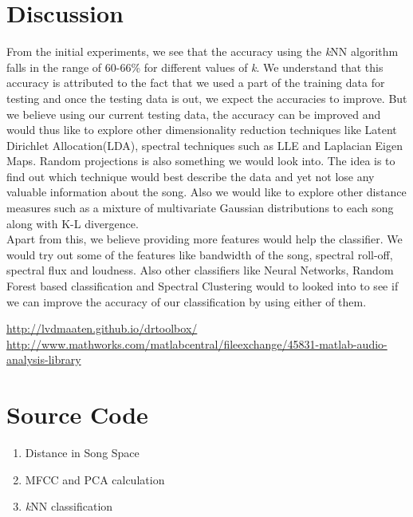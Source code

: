 \documentclass[12pt]{article}
\begin{document}
\section{Discussion}
\begin{flushleft}
From the initial experiments, we see that the accuracy using the \textit{k}NN algorithm falls in the range of 60-66\% for different values of \textit{k}. We understand that this accuracy is attributed to the fact that we used a part of the training data for testing and once the testing data is out, we expect the accuracies to improve. But we believe using our current testing data, the accuracy can be improved and would thus like to explore other dimensionality reduction techniques like Latent Dirichlet Allocation(LDA), spectral techniques such as LLE and Laplacian Eigen Maps. Random projections is also something we would look into. The idea is to find out which technique would best describe the data and yet not lose any valuable information about the song. Also we would like to explore other distance measures such as a mixture of multivariate Gaussian distributions to each song along with K-L divergence.\\
\vspace{0.5em}
Apart from this, we believe providing more features would help the classifier. We would try out some of the features like bandwidth of the song, spectral roll-off, spectral flux and loudness. Also other classifiers like Neural Networks, Random Forest based classification and Spectral Clustering would to looked into to see if we can improve the accuracy of our classification by using either of them.
\end{flushleft}
\begin{thebibliography}{}
 \url{http://lvdmaaten.github.io/drtoolbox/}
 \url{http://www.mathworks.com/matlabcentral/fileexchange/45831-matlab-audio-analysis-library}
\end{thebibliography}
\section{Source Code}
\begin{flushleft}
\begin{enumerate}
\item Distance in Song Space

\item MFCC and PCA calculation


\item \textit{k}NN classification



\end{enumerate}
\end{flushleft}
\end{document}
